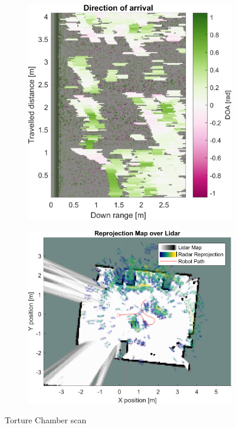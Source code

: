 \begin{figure}[htbp]
\begin{subfigure}[t]{0.475\linewidth}
    \end{subfigure}\bigskip\\
    \begin{subfigure}[t]{0.475\linewidth}  
        \centering 
        \includegraphics[width=\linewidth,max height=.475\textheight]{gfx/results/torturechamber_doa.png}
    \end{subfigure}%
    \hfill%
    \begin{subfigure}[t]{0.475\linewidth}   
        \centering 
        \includegraphics[width=\linewidth,max height=.475\textheight]{gfx/results/torturechamber_map.png}
    \end{subfigure}%
    \caption{Torture Chamber scan}
\end{figure}

